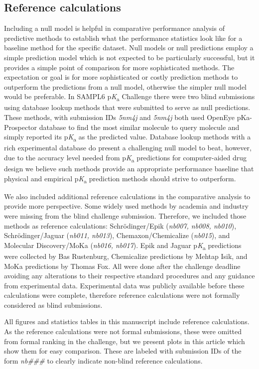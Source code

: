 \documentclass[9pt,lineno,final]{elife}
\newcommand{\pKa}{p\textit{K}\textsubscript{a}}
\begin{document}
\subsection{Reference calculations}

Including a null model is helpful in comparative performance analysis of predictive methods to establish what the performance statistics look like for a baseline method for the specific dataset. 
Null models or null predictions employ a simple prediction model which is not expected to be particularly successful, but it provides a simple point of comparison for more sophisticated methods. 
The expectation or goal is for more sophisticated or costly prediction methods to outperform the predictions from a null model, otherwise the simpler null model would be preferable. 
In SAMPL6 \pKa{} Challenge there were two blind submissions using database lookup methods that were submitted to serve as null predictions. These methods, with submission IDs \textit{5nm4j} and \textit{5nm4j} both used OpenEye pKa-Prospector database to find the most similar molecule to query molecule and simply reported its \pKa{} as the predicted value. 
Database lookup methods with a rich experimental database do present a challenging null model to beat, however, due to the accuracy level needed from \pKa{} predictions for computer-aided drug design we believe such methods provide an appropriate performance baseline that physical and empirical \pKa{} prediction methods should strive to outperform.

We also included additional reference calculations in the comparative analysis to provide more perspective. 
Some widely used methods by academia and industry were missing from the blind challenge submission. Therefore, we included those methods as reference calculations: Schr\"{o}dinger/Epik (\textit{nb007, nb008, nb010}), Schr\"{o}dinger/Jaguar (\textit{nb011, nb013}), Chemaxon/Chemicalize (\textit{nb015}), and Molecular Discovery/MoKa (\textit{nb016, nb017}). 
Epik and Jaguar \pKa{} predictions were collected by Bas Rustenburg, Chemicalize predictions by Mehtap Isik, and MoKa predictions by Thomas Fox. 
All were done after the challenge deadline avoiding any alterations to their respective standard procedures and any guidance from experimental data. 
Experimental data was publicly available before these calculations were complete, therefore reference calculations were not formally considered as blind submissions. 

All figures and statistics tables in this manuscript include reference calculations. 
As the reference calculations were not formal submissions, these were omitted from formal ranking in the challenge, but we present plots in this article which show them for easy comparison. 
These are labeled with submission IDs of the form \textit{nb\#\#\#} to clearly indicate non-blind reference calculations.
\end{document}
